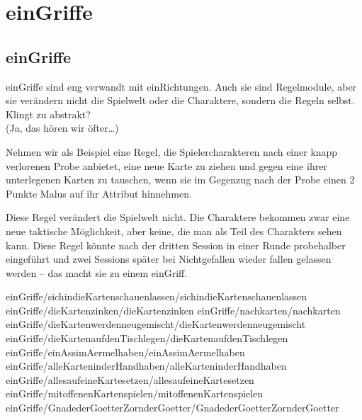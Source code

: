 \part {einGriffe}
\chapter {einGriffe}

einGriffe sind eng verwandt mit einRichtungen. Auch sie sind Regelmodule, aber sie verändern nicht die Spielwelt oder die Charaktere, sondern die Regeln selbst. Klingt zu abstrakt?\\
(Ja, das hören wir öfter\dots)

Nehmen wir als Beispiel eine Regel, die Spielercharakteren nach einer knapp verlorenen Probe anbietet, eine neue Karte zu ziehen und gegen eine ihrer unterlegenen Karten zu tauschen, wenn sie im Gegenzug nach der Probe einen 2 Punkte Malus auf ihr Attribut hinnehmen.

Diese Regel verändert die Spielwelt nicht. Die Charaktere bekommen zwar eine neue taktische Möglichkeit, aber keine, die man als Teil des Charakters sehen kann. Diese Regel könnte nach der dritten Session in einer Runde probehalber eingeführt und zwei Sessions später bei Nichtgefallen wieder fallen gelassen werden -- das macht sie zu einem einGriff.

 {einGriffe/sichindieKartenschauenlassen/sichindieKartenschauenlassen}
 {einGriffe/dieKartenzinken/dieKartenzinken}
 {einGriffe/nachkarten/nachkarten}
 {einGriffe/dieKartenwerdenneugemischt/dieKartenwerdenneugemischt}
 {einGriffe/dieKartenaufdenTischlegen/dieKartenaufdenTischlegen}
 {einGriffe/einAssimAermelhaben/einAssimAermelhaben}
 {einGriffe/alleKarteninderHandhaben/alleKarteninderHandhaben}
 {einGriffe/allesaufeineKartesetzen/allesaufeineKartesetzen}
 {einGriffe/mitoffenenKartenspielen/mitoffenenKartenspielen}
 {einGriffe/GnadederGoetterZornderGoetter/GnadederGoetterZornderGoetter}
